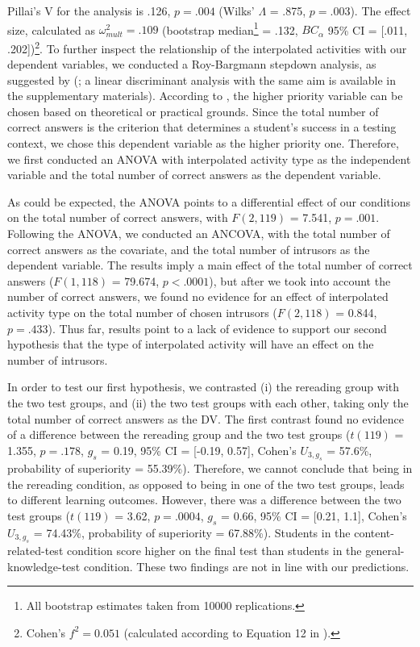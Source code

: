 Pillai's V for the analysis is .126, \(p = .004\) (Wilks' \(\Lambda\) =
.875, \(p = .003\)). The effect size, calculated as
\(\omega^2_{mult} = .109\) (bootstrap
median\footnote{All bootstrap estimates taken from 10000 replications.}
= .132, \(BC_\alpha\) 95\% CI = {[}.011, .202{]})\footnote{
Cohen's \(f^2 = 0.051\) (calculated according to Equation 12 in
\citealp{steynjrEstimatingEffectSize2009}).
}. To further inspect the relationship of the interpolated activities
with our dependent variables, we conducted a Roy-Bargmann stepdown
analysis, as suggested by
\citeauthor{tabachnickUsingMultivariateStatistics2012}
(\citeyear{tabachnickUsingMultivariateStatistics2012}; a linear
discriminant analysis with the same aim is available in the
supplementary materials). According to
\citet{tabachnickUsingMultivariateStatistics2012}, the higher priority
variable can be chosen based on theoretical or practical grounds. Since
the total number of correct answers is the criterion that determines a
student's success in a testing context, we chose this dependent variable
as the higher priority one. Therefore, we first conducted an ANOVA with
interpolated activity type as the independent variable and the total
number of correct answers as the dependent variable.

As could be expected, the ANOVA points to a differential effect of our
conditions on the total number of correct answers, with \(F(2, 119)\) =
7.541, \(p = .001\). Following the ANOVA, we conducted an ANCOVA, with
the total number of correct answers as the covariate, and the total
number of intrusors as the dependent variable. The results imply a main
effect of the total number of correct answers (\(F(1, 118)\) = 79.674,
\(p < .0001\)), but after we took into account the number of correct
answers, we found no evidence for an effect of interpolated activity
type on the total number of chosen intrusors (\(F (2, 118)\) = 0.844,
\(p = .433\)). Thus far, results point to a lack of evidence to support
our second hypothesis that the type of interpolated activity will have
an effect on the number of intrusors.

In order to test our first hypothesis, we contrasted (i) the rereading
group with the two test groups, and (ii) the two test groups with each
other, taking only the total number of correct answers as the DV. The
first contrast found no evidence of a difference between the rereading
group and the two test groups (\(t(119)\) = 1.355, \(p = .178\), \(g_s\)
= 0.19, 95\% CI = {[}-0.19, 0.57{]}, Cohen's \(U_{3, g_s}\) = 57.6\%,
probability of superiority = 55.39\%). Therefore, we cannot conclude
that being in the rereading condition, as opposed to being in one of the
two test groups, leads to different learning outcomes. However, there
was a difference between the two test groups (\(t(119)\) = 3.62,
\(p = .0004\), \(g_s\) = 0.66, 95\% CI = {[}0.21, 1.1{]}, Cohen's
\(U_{3, g_s}\) = 74.43\%, probability of superiority = 67.88\%).
Students in the content-related-test condition score higher on the final
test than students in the general-knowledge-test condition. These two
findings are not in line with our predictions.

